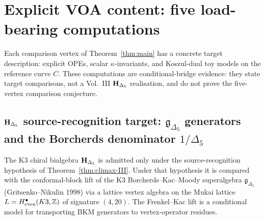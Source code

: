 %
%

\section{Explicit VOA content: five load-bearing computations}
\label{sec:voa-explicit}

Each comparison vertex of Theorem~\ref{thm:main} has a concrete
target description: explicit OPEs, scalar $\kappa$-invariants, and
Koszul-dual toy models on the reference curve $C$. These computations
are conditional-bridge evidence: they state target comparisons, not a
Vol.~III $\mathbf{H}_{\Delta_5}$ realisation, and do not prove the five-vertex
comparison conjecture.

\subsection{$\mathbf{H}_{\Delta_5}$ source-recognition target: $\mathfrak g_{\Delta_5}$ generators and the Borcherds denominator $1/\Delta_5$}
\label{subsec:voa-H-Delta5-canonical}

The K3 chiral bialgebra $\mathbf{H}_{\Delta_5}$ is admitted only under the
source-recognition hypothesis of Theorem~\ref{thm:climax-III}. Under
that hypothesis it is compared with the conformal-block lift of the K3
Borcherds--Kac--Moody superalgebra $\mathfrak g_{\Delta_5}$
(Gritsenko--Nikulin 1998) via a lattice vertex algebra on the Mukai
lattice $L = H^\bullet_{\mathrm{even}}(K3,\mathbb{Z})$ of signature
$(4,20)$. The Frenkel--Kac lift is a conditional model for
transporting BKM generators to vertex-operator residues.

